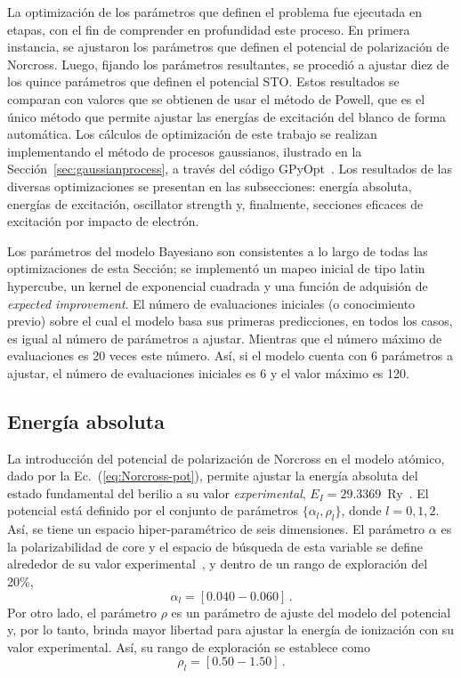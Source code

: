 La optimización de los parámetros que definen el problema fue ejecutada 
en etapas, con el fin de comprender en profundidad este proceso. En 
primera instancia, se ajustaron los parámetros que definen el potencial 
de polarización de Norcross. Luego, fijando los parámetros resultantes, 
se procedió a ajustar diez de los quince parámetros que definen el 
potencial STO. Estos resultados se comparan con valores que se obtienen 
de usar el método de Powell, que es el único método que permite ajustar 
las energías de excitación del blanco de forma automática. Los cálculos 
de optimización de este trabajo se realizan implementando el método de 
procesos gaussianos, ilustrado en la Sección~\ref{sec:gaussianprocess}, 
a través del código GPyOpt~\cite{GPyOpt}. Los resultados de las diversas 
optimizaciones se presentan en las subsecciones: energía absoluta, 
energías de excitación, oscillator strength y, finalmente, secciones 
eficaces de excitación por impacto de electrón. 

Los parámetros del modelo Bayesiano son consistentes a lo largo de todas 
las optimizaciones de esta Sección; se implementó un mapeo inicial de 
tipo latin hypercube, un kernel de exponencial cuadrada y una función de 
adquisión de \textit{expected improvement}. El número de evaluaciones 
iniciales (o conocimiento previo) sobre el cual el modelo basa sus 
primeras predicciones, en todos los casos, es igual al número de 
parámetros a ajustar. Mientras que el número máximo de evaluaciones es 
20 veces este número. Así, si el modelo cuenta con 6 parámetros a 
ajustar, el número de evaluaciones iniciales es 6 y el valor máximo es 
120.

\subsection{Energía absoluta}

La introducción del potencial de polarización de Norcross en el modelo 
atómico, dado por la Ec.~(\ref{eq:Norcross-pot}), permite ajustar la 
energía absoluta del estado fundamental del berilio a su valor 
\textit{experimental}, \mbox{$E_I=29.3369$ Ry}~\cite{NIST}. El potencial 
está definido por el conjunto de parámetros $\{\alpha_l,\rho_l\}$, donde 
$l=0,1,2$. Así, se tiene un espacio hiper-paramétrico de seis 
dimensiones. El parámetro $\alpha$ es la polarizabilidad de core y el 
espacio de búsqueda de esta variable se define alrededor de su valor 
experimental~\cite{Dalgarno:62,Sitz:71}, 
y dentro de un rango de exploración del 20\%,
\begin{equation}
\alpha_l=[0.040-0.060]\,.
\end{equation}
Por otro lado, el parámetro $\rho$ es un parámetro de ajuste del modelo 
del potencial y, por lo tanto, brinda mayor libertad para ajustar la 
energía de ionización con su valor experimental. Así, su rango de 
exploración se establece como
\begin{equation}
\rho_l=[0.50-1.50]\,.
\end{equation}

